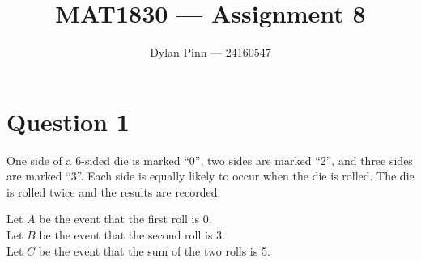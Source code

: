 \documentclass[11pt]{article}
\begin{document}
\title{MAT1830 --- Assignment 8}
\author{Dylan Pinn --- 24160547}
\maketitle

\section*{Question 1}

One side of a 6-sided die is marked ``0'', two sides are marked ``2'', and three
sides are marked ``3''. Each side is equally likely to occur when the die is
rolled. The die is rolled twice and the results are recorded.

\noindent
Let $A$ be the event that the first roll is 0. \\
Let $B$ be the event that the second roll is 3. \\
Let $C$ be the event that the sum of the two rolls is 5.
\end{document}
